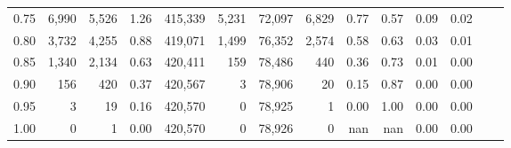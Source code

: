\begin{tabular}{rrrrrrrrrrrrrr}
0.75 &   6,990 &   5,526 &    1.26 &  415,339 &    5,231 &  72,097 &   6,829 &  0.77 &  0.57 &  0.09 &      0.02 \\
0.80 &   3,732 &   4,255 &    0.88 &  419,071 &    1,499 &  76,352 &   2,574 &  0.58 &  0.63 &  0.03 &      0.01 \\
0.85 &   1,340 &   2,134 &    0.63 &  420,411 &      159 &  78,486 &     440 &  0.36 &  0.73 &  0.01 &      0.00 \\
0.90 &     156 &     420 &    0.37 &  420,567 &        3 &  78,906 &      20 &  0.15 &  0.87 &  0.00 &      0.00 \\
0.95 &       3 &      19 &    0.16 &  420,570 &        0 &  78,925 &       1 &  0.00 &  1.00 &  0.00 &      0.00 \\
1.00 &       0 &       1 &    0.00 &  420,570 &        0 &  78,926 &       0 &   nan &   nan &  0.00 &      0.00 \\
\bottomrule
\end{tabular}
